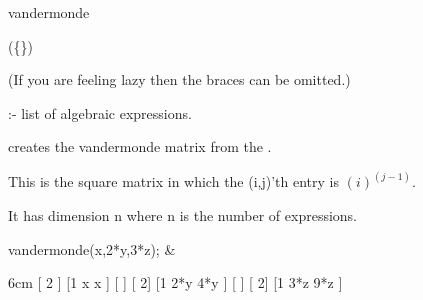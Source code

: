 \begin{Operator}{vandermonde}

\begin{Syntax}  
(\{\})  
\end{Syntax}
(If you are feeling lazy then the braces can be omitted.)

 :- list of algebraic expressions.

 creates the vandermonde matrix from the 
.

This is the square matrix in which the (i,j)'th entry is 
$(i)^(j-1)$.

It has dimension n where n is the number of expressions.

         
\begin{Examples}             
vandermonde({x,2*y,3*z}); &
\begin{multilineoutput}{6cm}
[          2 ]
[1   x    x  ]
[            ]
[           2]
[1  2*y  4*y ]
[            ]
[           2]
[1  3*z  9*z ]
\end{multilineoutput}

\end{Examples}

\end{Operator}

